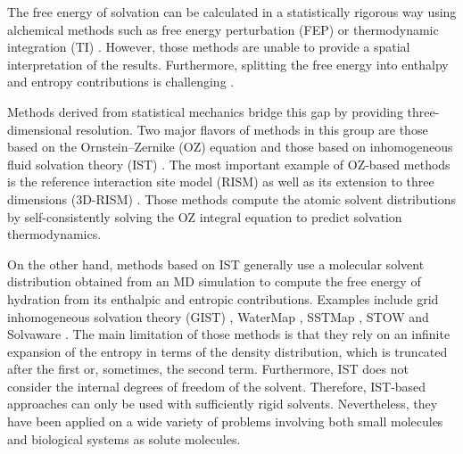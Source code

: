 \documentclass[9pt,tutorial]{livecoms}
\begin{document}
The free energy of solvation can be calculated in a statistically rigorous way using alchemical methods \cite{Liu2016-md-solubility,Mobley2009-dgsolv,Mobley2014-freesolv} such as free energy perturbation (FEP) \cite{Zwanzig1954-reweighting} or thermodynamic integration (TI) \cite{Kirkwood1935-ti}.
However, those methods are unable to provide a spatial interpretation of the results.
Furthermore, splitting the free energy into enthalpy and entropy contributions is challenging \cite{Peter2004-alchemical-entropy}.

Methods derived from statistical mechanics bridge this gap by providing three-dimensional resolution.
Two major flavors of methods in this group are those based on the Ornstein--Zernike (OZ) equation \cite{Hansen2013-simple-liquids} and those based on inhomogeneous fluid solvation theory (IST) \cite{Lazaridis1998}.
The most important example of OZ-based methods is the reference interaction site model (RISM) \cite{Chandler1972-rism} as well as its extension to three dimensions (3D-RISM) \cite{Kovalenko1998-3drism}.
Those methods compute the atomic solvent distributions by self-consistently solving the OZ integral equation to predict solvation thermodynamics.

On the other hand, methods based on IST generally use a molecular solvent distribution obtained from an MD simulation to compute the free energy of hydration from its enthalpic and entropic contributions.
Examples include grid inhomogeneous solvation theory (GIST) \cite{Nguyen2012,Ramsey2016}, WaterMap \cite{Young2007-watermap,Abel2008-watermap}, SSTMap \cite{Haider2018-sstmap}, STOW \cite{Li2012-stow} and Solvaware \cite{Huggins2016-solvaware}.
The main limitation of those methods is that they rely on an infinite expansion of the entropy in terms of the density distribution, which is truncated after the first or, sometimes, the second \cite{Nguyen2016-gist-second-order,Waibl2022-gist-solvents} term.
Furthermore, IST does not consider the internal degrees of freedom of the solvent.
Therefore, IST-based approaches can only be used with sufficiently rigid solvents.
Nevertheless, they have been applied on a wide variety of problems involving both small molecules and biological systems as solute molecules.
\end{document}

